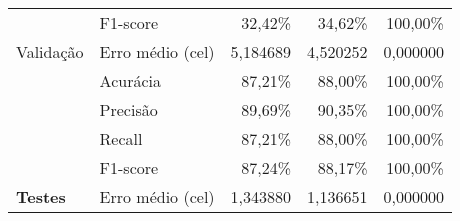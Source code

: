 \begin{table}[ht!]
{\begin{tabular}{l|l|r|r|r}
                                              & F1-score                                            & 32,42\%                          & 34,62\%                          & 100,00\%                         \\
            \multirow{-5}{*}{Validação}       & Erro médio (\acrshort{cel})                         & 5,184689                         & 4,520252                         & 0,000000                         \\ \hline
                                              & \cellcolor[HTML]{FFF5E1}Acurácia                    & \cellcolor[HTML]{FFF5E1}87,21\%  & \cellcolor[HTML]{FFF5E1}88,00\%  & \cellcolor[HTML]{FFF5E1}100,00\% \\
                                              & Precisão                                            & 89,69\%                          & 90,35\%                          & 100,00\%                         \\
                                              & Recall                                              & 87,21\%                          & 88,00\%                          & 100,00\%                         \\
                                              & F1-score                                            & 87,24\%                          & 88,17\%                          & 100,00\%                         \\
            \multirow{-5}{*}{\textbf{Testes}} & \cellcolor[HTML]{FFF5E1}Erro médio (\acrshort{cel}) & \cellcolor[HTML]{FFF5E1}1,343880 & \cellcolor[HTML]{FFF5E1}1,136651 & \cellcolor[HTML]{FFF5E1}0,000000 \\ \hline
        \end{tabular}%
    }
    \nomefonte{}
\end{table}